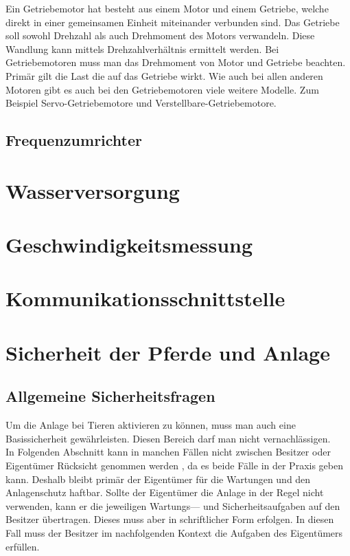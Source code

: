 \documentclass[12pt]{scrreprt} %
\begin{document}
Ein Getriebemotor hat besteht aus einem Motor und einem Getriebe, welche direkt in einer gemeinsamen Einheit miteinander verbunden sind. Das Getriebe soll sowohl Drehzahl als auch Drehmoment des Motors verwandeln. Diese Wandlung kann mittels Drehzahlverhältnis ermittelt werden. Bei Getriebemotoren muss man das Drehmoment von Motor und Getriebe beachten. Primär gilt die Last die auf das Getriebe wirkt. 
Wie auch bei allen anderen Motoren gibt es auch bei den Getriebemotoren viele weitere Modelle. Zum Beispiel Servo-Getriebemotore und Verstellbare-Getriebemotore.

\newpage
\subsection{Frequenzumrichter}
\label{sec:frequenzumrichter}
\newpage
\section{Wasserversorgung}
\label{sec:wasserversorgung}
\newpage
\section{Geschwindigkeitsmessung}
\label{sec:geschwindigkeitsmessung}
\newpage
\section{Kommunikationsschnittstelle}
\label{sec:kommunikationsschnittstelle}
\newpage
\section{Sicherheit der Pferde und Anlage}
\label{sec:sicherheitDerPferdeUndAnlage}

\subsection{Allgemeine Sicherheitsfragen}
\label{sec:allgemeineSicherheitsfragen}

Um die Anlage bei Tieren aktivieren zu können, muss man auch eine Basissicherheit gewährleisten.
Diesen Bereich darf man nicht vernachlässigen. \\ In Folgenden Abschnitt  kann in manchen Fällen nicht zwischen Besitzer oder Eigentümer Rücksicht genommen werden , da es beide Fälle in der Praxis geben kann. Deshalb bleibt primär der Eigentümer für die Wartungen und den Anlagenschutz haftbar. Sollte der Eigentümer die Anlage in der Regel nicht verwenden, kann er die jeweiligen Wartungs--- und Sicherheitsaufgaben auf den Besitzer übertragen. Dieses muss aber in schriftlicher Form erfolgen. In diesen Fall muss der Besitzer im nachfolgenden Kontext die Aufgaben des Eigentümers erfüllen.
\end{document}
